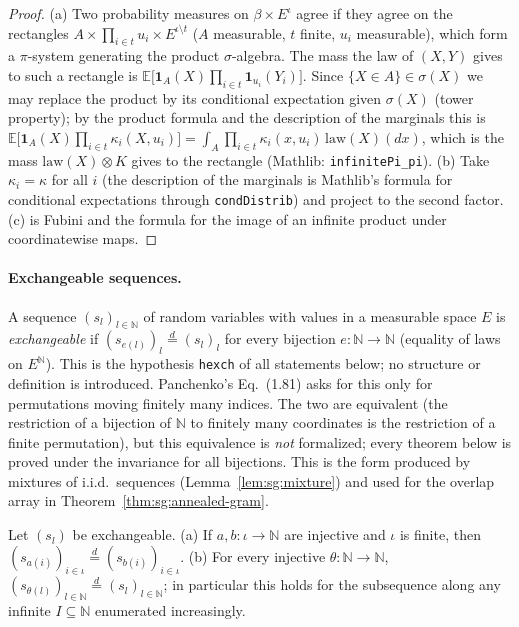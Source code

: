 \begin{proof}
  \leanok
(a) Two probability measures on $\beta\times E^{\iota}$ agree if they agree on the rectangles $A\times\prod_{i\in t}u_i\times E^{\iota\setminus t}$ ($A$ measurable, $t$ finite, $u_i$ measurable), which form a $\pi$-system generating the product $\sigma$-algebra.
The mass the law of $(X,Y)$ gives to such a rectangle is $\mathbb E\big[\mathbf 1_A(X)\prod_{i\in t}\mathbf 1_{u_i}(Y_i)\big]$. Since $\{X\in A\}\in\sigma(X)$ we may replace the product by its conditional expectation given $\sigma(X)$ (tower property); by the product formula and the
description of the marginals this is $\mathbb E\big[\mathbf 1_A(X)\prod_{i\in t}\kappa_i(X,u_i)\big]=\int_A\prod_{i\in t}\kappa_i(x,u_i)\,\mathrm{law}(X)(dx)$, which is the mass $\mathrm{law}(X)\otimes K$ gives to the rectangle (Mathlib: \texttt{infinitePi\_pi}).
(b) Take $\kappa_i=\kappa$ for all $i$ (the description of the marginals is Mathlib's formula for conditional expectations through \texttt{condDistrib}) and project to the second factor. (c) is Fubini and the formula for the image of an infinite product under coordinatewise maps.
\end{proof}

\paragraph{Exchangeable sequences.}
A sequence $(s_l)_{l\in\mathbb N}$ of random variables with values in a measurable space $E$ is \emph{exchangeable} if $(s_{e(l)})_{l}\overset d=(s_l)_{l}$ for every bijection $e:\mathbb N\to\mathbb N$ (equality of laws on $E^{\mathbb N}$).
This is the hypothesis \texttt{hexch} of all statements below; no structure or definition is introduced. Panchenko's Eq.~(1.81) asks for this only for permutations moving finitely many indices. The two are equivalent
(the restriction of a bijection of $\mathbb N$ to finitely many coordinates is the restriction of a finite permutation), but this equivalence is \emph{not} formalized; every theorem below is proved under the invariance for all bijections.
This is the form produced by mixtures of i.i.d.\ sequences (Lemma~\ref{lem:sg:mixture}) and used for the overlap array in Theorem~\ref{thm:sg:annealed-gram}.

\begin{lemma}\label{lem:sg:subseq}
  \leanok
Let $(s_l)$ be exchangeable. (a) If $a,b:\iota\to\mathbb N$ are injective and $\iota$ is finite, then $(s_{a(i)})_{i\in\iota}\overset d=(s_{b(i)})_{i\in\iota}$. (b) For every injective $\theta:\mathbb N\to\mathbb N$,
$(s_{\theta(l)})_{l\in\mathbb N}\overset d=(s_l)_{l\in\mathbb N}$; in particular this holds for the subsequence along any infinite $I\subseteq\mathbb N$ enumerated increasingly.
\end{lemma}


